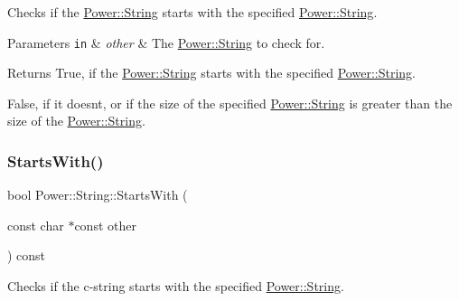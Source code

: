 Checks if the \hyperlink{class_power_1_1_string}{Power\+::\+String} starts with the specified \hyperlink{class_power_1_1_string}{Power\+::\+String}. 


\begin{DoxyParams}[1]{Parameters}
\mbox{\tt in}  & {\em other} & The \hyperlink{class_power_1_1_string}{Power\+::\+String} to check for. \\
\hline
\end{DoxyParams}
\begin{DoxyReturn}{Returns}
True, if the \hyperlink{class_power_1_1_string}{Power\+::\+String} starts with the specified \hyperlink{class_power_1_1_string}{Power\+::\+String}. 

False, if it doesn\textquotesingle{}t, or if the size of the specified \hyperlink{class_power_1_1_string}{Power\+::\+String} is greater than the size of the \hyperlink{class_power_1_1_string}{Power\+::\+String}. 
\end{DoxyReturn}
\mbox{\label{class_power_1_1_string_a97d52a90799b590cfed6f3ce9d2204fc}} 
\subsubsection{\texorpdfstring{Starts\+With()}{StartsWith()}\hspace{0.1cm}{\footnotesize\ttfamily [2/4]}}
{\footnotesize\ttfamily bool Power\+::\+String\+::\+Starts\+With (\begin{DoxyParamCaption}\item[{const char $\ast$const}]{other }\end{DoxyParamCaption}) const\hspace{0.3cm}{\ttfamily [inline]}}



Checks if the c-\/string starts with the specified \hyperlink{class_power_1_1_string}{Power\+::\+String}. 


